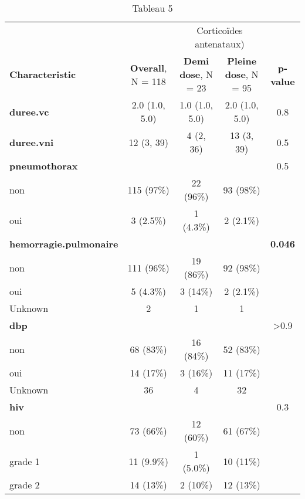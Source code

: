\documentclass[
  10pt,
  a4paper,
]{scrartcl}
\begin{document}
\begin{table}

\caption{\label{tab:xtable5}Tableau 5}
\centering
\begin{tabular}[t]{l|c|c|c|c}
\hline
\multicolumn{2}{c|}{ } & \multicolumn{2}{c|}{Corticoïdes antenataux)} & \multicolumn{1}{c}{ } \\
\cline{3-4}
\textbf{Characteristic} & \textbf{Overall}, N = 118 & \textbf{Demi dose}, N = 23 & \textbf{Pleine dose}, N = 95 & \textbf{p-value}\\
\hline
\textbf{duree.vc} & 2.0 (1.0, 5.0) & 1.0 (1.0, 5.0) & 2.0 (1.0, 5.0) & 0.8\\
\hline
\textbf{duree.vni} & 12 (3, 39) & 4 (2, 36) & 13 (3, 39) & 0.5\\
\hline
\textbf{pneumothorax} &  &  &  & 0.5\\
\hline
\hspace{1em}non & 115 (97\%) & 22 (96\%) & 93 (98\%) & \\
\hline
\hspace{1em}oui & 3 (2.5\%) & 1 (4.3\%) & 2 (2.1\%) & \\
\hline
\textbf{hemorragie.pulmonaire} &  &  &  & \textbf{0.046}\\
\hline
\hspace{1em}non & 111 (96\%) & 19 (86\%) & 92 (98\%) & \\
\hline
\hspace{1em}oui & 5 (4.3\%) & 3 (14\%) & 2 (2.1\%) & \\
\hline
\hspace{1em}Unknown & 2 & 1 & 1 & \\
\hline
\textbf{dbp} &  &  &  & >0.9\\
\hline
\hspace{1em}non & 68 (83\%) & 16 (84\%) & 52 (83\%) & \\
\hline
\hspace{1em}oui & 14 (17\%) & 3 (16\%) & 11 (17\%) & \\
\hline
\hspace{1em}Unknown & 36 & 4 & 32 & \\
\hline
\textbf{hiv} &  &  &  & 0.3\\
\hline
\hspace{1em}non & 73 (66\%) & 12 (60\%) & 61 (67\%) & \\
\hline
\hspace{1em}grade 1 & 11 (9.9\%) & 1 (5.0\%) & 10 (11\%) & \\
\hline
\hspace{1em}grade 2 & 14 (13\%) & 2 (10\%) & 12 (13\%) & \\

\end{tabular}
\end{table}
\end{document}
